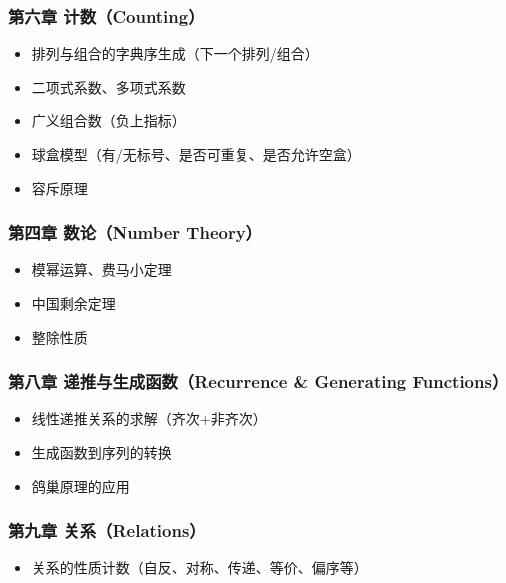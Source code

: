 \documentclass[10pt,a4paper,openany]{ctexbook}
\theoremstyle{definition}
\theoremstyle{remark}
\begin{document}
\subsubsection{第六章 计数（Counting）}

\begin{itemize}
\item 排列与组合的字典序生成（下一个排列/组合）
\item 二项式系数、多项式系数
\item 广义组合数（负上指标）
\item 球盒模型（有/无标号、是否可重复、是否允许空盒）
\item 容斥原理

\end{itemize}

\subsubsection{第四章 数论（Number Theory）}

\begin{itemize}
\item 模幂运算、费马小定理
\item 中国剩余定理
\item 整除性质

\end{itemize}

\subsubsection{第八章 递推与生成函数（Recurrence \& Generating Functions）}

\begin{itemize}
\item 线性递推关系的求解（齐次+非齐次）
\item 生成函数到序列的转换
\item 鸽巢原理的应用

\end{itemize}

\subsubsection{第九章 关系（Relations）}

\begin{itemize}
\item 关系的性质计数（自反、对称、传递、等价、偏序等）

\end{itemize}
\end{document}
